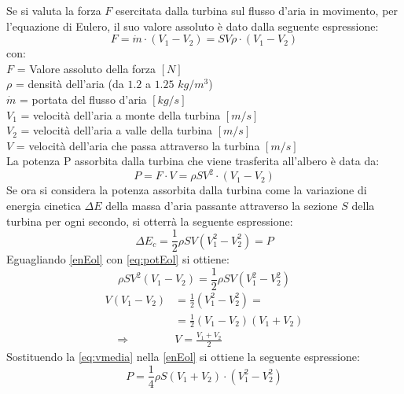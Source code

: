 Se si valuta la forza $F$ esercitata dalla turbina sul flusso d'aria in movimento, per l'equazione di Eulero, il suo valore assoluto è dato dalla seguente espressione:
\begin{equation}
F = \dot{m} \cdot \left( V_1 - V_2 \right) = S V \rho \cdot \left( V_1 - V_2 \right)
\end{equation}
con:\\[1mm]
$F$ = Valore assoluto della forza $[N]$\\
$\rho$ = densità dell'aria (da $1.2$ a $1.25$ $kg/m^3$)\\
$\dot{m}$ = portata del flusso d'aria $[kg/s]$\\
$V_1$ = velocità dell'aria a monte della turbina $[m/s]$\\
$V_2$ = velocità dell'aria a valle della turbina $[m/s]$\\
$V$ = velocità dell'aria che passa attraverso la turbina $[m/s]$\\[2mm]
La potenza P assorbita dalla turbina che viene trasferita all'albero è data da:
\begin{equation}\label{eq:potEol}
P = F \cdot V = \rho S V^2 \cdot \left( V_1 - V_2 \right)
\end{equation}
Se ora si considera la potenza assorbita dalla turbina come la variazione di energia cinetica $\Delta E$ della massa d'aria passante attraverso la sezione $S$ della turbina per ogni secondo, si otterrà la seguente espressione:
\begin{equation}\label{enEol}
\Delta E_c = \frac{1}{2} \rho	S V \left(V_1^2 - V_2^2 \right) = P
\end{equation}
Eguagliando \ref{enEol} con \ref{eq:potEol} si ottiene:
\begin{equation}
\rho S V^2 \left(V_1 - V_2 \right) = \frac{1}{2} \rho S V \left(V_1^2-V_2^2 \right)
\label{eq:P_a2}
\end{equation}
\begin{align}
	V \left(V_1 - V_2 \right)& = \frac{1}{2} \left(V_1^2-V_2^2 \right) = \\
	& = \frac{1}{2} \left(V_1-V_2 \right)\left(V_1+V_2 \right) \\
	\;\;\;\; \Rightarrow \;\;\;\; & V = \frac{V_1 + V_2}{2}
	\label{eq:vmedia}
\end{align}
Sostituendo la \ref{eq:vmedia} nella \ref{enEol} si ottiene la seguente espressione:
\begin{equation}\label{eq:potfin}
P = \frac{1}{4} \rho S \left( V_1 +V_2 \right) \cdot \left(V_1^2 - V_2^2 \right)
\end{equation}
